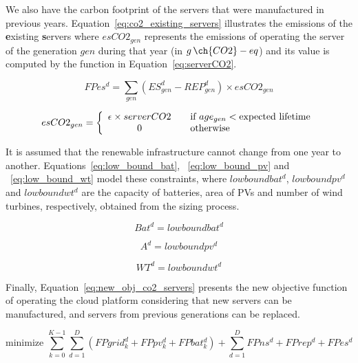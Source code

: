 We also have the carbon footprint of the servers that were manufactured in previous years. Equation~\eqref{eq:co2_existing_servers} illustrates the emissions of the \textbf{e}xisting \textbf{s}ervers where $esCO2_{gen}$ represents the emissions of operating the server of the generation $gen$ during that year (in $g\,\ch{CO2}-eq$) and its value is computed by the function in Equation~\eqref{eq:serverCO2}.


\begin{equation} \label{eq:co2_existing_servers}
FPes^d = \sum_{gen} (ES_{gen}^d - REP_{gen}^d)  \times esCO2_{gen}
\end{equation}


\begin{equation} \label{eq:serverCO2}
esCO2_{gen} =  \left\{ 
  \begin{array}{ c l }
    \epsilon \times serverCO2   & \quad \textrm{if $age_{gen}$}    < \textrm{expected lifetime}   \\
    0     & \quad \textrm{otherwise  } \\
  \end{array}
\right.
\end{equation}

It is assumed that the renewable infrastructure cannot change from one year to another. Equations~\eqref{eq:low_bound_bat},  ~\eqref{eq:low_bound_pv} and ~\eqref{eq:low_bound_wt} model these constraints, where $lowboundbat^d$, $lowboundpv^d$ and $lowboundwt^d$ are the capacity of batteries, area of PVs and number of wind turbines, respectively, obtained from the sizing process.

\begin{equation} \label{eq:low_bound_bat}
Bat^d = lowboundbat^d
\end{equation}

\begin{equation} \label{eq:low_bound_pv}
A^d = lowboundpv^d
\end{equation}

\begin{equation} \label{eq:low_bound_wt}
WT^d = lowboundwt^d
\end{equation}


Finally, Equation~\eqref{eq:new_obj_co2_servers} presents the new objective function of operating the cloud platform considering that new servers can be manufactured, and servers from previous generations can be replaced.

\begin{equation} \label{eq:new_obj_co2_servers}
\text{minimize }\sum_{k=0}^{K-1} \sum_{d=1}^D (FPgrid^d_k +  FPpv^d_k + FPbat^d_k) + \sum_{d=1}^D   FPns^d + FPrep^d + FPes^d 
\end{equation}

